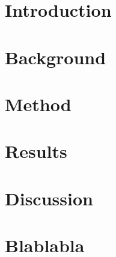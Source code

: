 \documentclass[11pt,fleqn]{report}
\begin{document}
\makecoverpage


\tableofcontents

\begin{abstract}
Blablabla abstract

\begin{keywords}
keyword one, keyword two, keyword three
\end{keywords}
\end{abstract}

\setcounter{page}{1}


\chapter{Introduction}

\chapter{Background}

\chapter{Method}

\chapter{Results}

\chapter{Discussion}



\appendix
\chapter{Blablabla}
\end{document}
